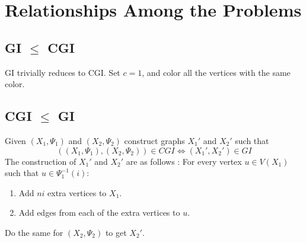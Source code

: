 \section{Relationships Among the Problems}


\subsection{GI $\le$ CGI}
GI trivially reduces to CGI.	Set $c=1$, and color all the vertices with the same color.


\subsection{CGI $\le$ GI}
Given $(X_1,\Psi_1)$ and $(X_2,\Psi_2)$ construct graphs $X_1'$ and $X_2'$ such that 
\[ ((X_1,\Psi_1),(X_2,\Psi_2))\in CGI \iff (X_1',X_2')\in GI \]
The construction of $X_1'$ and $X_2'$ are as follows :
For every vertex $u \in V(X_1)$ such that $u \in \Psi_1^{-1}(i)$:
\begin{enumerate}
\item Add $ni$ extra vertices to $X_1$.
\item Add edges from each of the extra vertices to $u$.
\end{enumerate}
Do the same for $(X_2,\Psi_2)$ to get $X_2'$.\\

